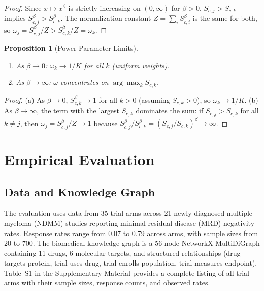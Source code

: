 \documentclass[12pt]{article}
\newtheorem{proposition}{Proposition}
\begin{document}
\begin{proof}
Since $x \mapsto x^\beta$ is strictly increasing on $(0, \infty)$ for $\beta > 0$, $S_{c,j} > S_{c,k}$ implies $S_{c,j}^\beta > S_{c,k}^\beta$. The normalization constant $Z = \sum_i S_{c,i}^\beta$ is the same for both, so $\omega_j = S_{c,j}^\beta / Z > S_{c,k}^\beta / Z = \omega_k$.
\end{proof}

\begin{proposition}[Power Parameter Limits]
\label{prop:limits}
\leavevmode
\begin{enumerate}
    \item[(a)] As $\beta \to 0$: $\omega_k \to 1/K$ for all $k$ (uniform weights).
    \item[(b)] As $\beta \to \infty$: $\omega$ concentrates on $\arg\max_k S_{c,k}$.
\end{enumerate}
\end{proposition}

\begin{proof}
(a) As $\beta \to 0$, $S_{c,k}^\beta \to 1$ for all $k > 0$ (assuming $S_{c,k} > 0$), so $\omega_k \to 1/K$.
(b) As $\beta \to \infty$, the term with the largest $S_{c,k}$ dominates the sum: if $S_{c,j} > S_{c,k}$ for all $k \neq j$, then $\omega_j = S_{c,j}^\beta / Z \to 1$ because $S_{c,j}^\beta / S_{c,k}^\beta = (S_{c,j}/S_{c,k})^\beta \to \infty$.
\end{proof}

\section{Empirical Evaluation}
\label{sec:results}

\subsection{Data and Knowledge Graph}
\label{sec:data}

The evaluation uses data from 35 trial arms across 21 newly diagnosed multiple myeloma (NDMM) studies reporting minimal residual disease (MRD) negativity rates. Response rates range from 0.07 to 0.79 across arms, with sample sizes from 20 to 700. The biomedical knowledge graph is a 56-node NetworkX MultiDiGraph containing 11 drugs, 6 molecular targets, and structured relationships (drug-targets-protein, trial-uses-drug, trial-enrolls-population, trial-measures-endpoint). Table~S1 in the Supplementary Material provides a complete listing of all trial arms with their sample sizes, response counts, and observed rates.
\end{document}
